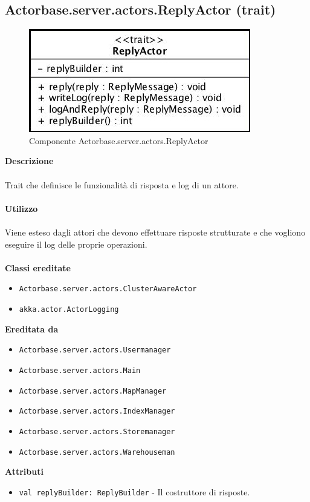 \documentclass[a4paper]{article}
\begin{document}
	\subsection{Actorbase.server.actors.ReplyActor (trait)}
		\begin{figure}[H]
			\centering
			\includegraphics[scale = 0.6]{Server/replyactor.jpg}
			\caption{Componente Actorbase.server.actors.ReplyActor}
		\end{figure}
		\textbf{Descrizione}
			\\ \\
			Trait che definisce le funzionalità di risposta e log di un attore.
			\\ \\
		\textbf{Utilizzo}
			\\ \\
			Viene esteso dagli attori che devono effettuare risposte strutturate e che vogliono eseguire il log delle proprie operazioni.
			\\ \\
		\textbf{Classi ereditate}
			\begin{itemize}
				\item \texttt{Actorbase.server.actors.ClusterAwareActor}
				\item \texttt{akka.actor.ActorLogging}
			\end{itemize}
		\textbf{Ereditata da}
			\begin{itemize}
				\item \texttt{Actorbase.server.actors.Usermanager}
				\item \texttt{Actorbase.server.actors.Main}
				\item \texttt{Actorbase.server.actors.MapManager}
				\item \texttt{Actorbase.server.actors.IndexManager}
				\item \texttt{Actorbase.server.actors.Storemanager}
				\item \texttt{Actorbase.server.actors.Warehouseman}
			\end{itemize}
		\textbf{Attributi}
			\begin{itemize}
				\item \texttt{val replyBuilder: ReplyBuilder} - Il costruttore di risposte. 
			\end{itemize}
\end{document}
